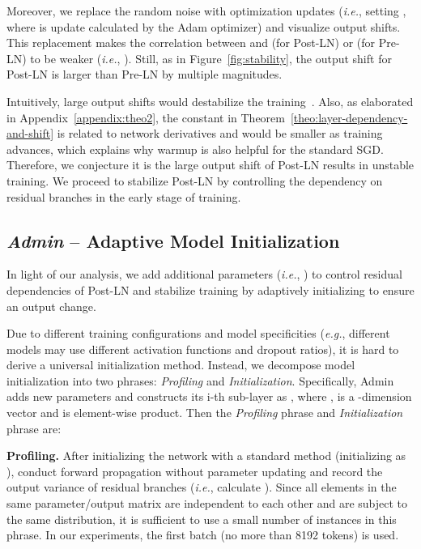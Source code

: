 \documentclass[11pt,a4paper]{article}
\newcommand{\our}{\mbox{Admin}\xspace}
\newcommand{\eg}{\textit{e.g.}}
\newcommand{\ie}{\textit{i.e.}}
\newcommand{\smallsection}[1]{{\vspace{0.2cm}\noindent\textbf{#1.}}}
\begin{document}
Moreover, we replace the random noise  with optimization updates (\ie, setting , where  is update calculated by the Adam optimizer) and visualize output shifts. 
This replacement makes the correlation between  and  (for Post-LN) or  (for Pre-LN) to be weaker (\ie, ).
Still, as in Figure~\ref{fig:stability}, the output shift  for Post-LN is larger than Pre-LN by multiple magnitudes. 

Intuitively, large output shifts would destabilize the training~\cite{Li2018VisualizingTL}.
Also, as elaborated in Appendix~\ref{appendix:theo2}, the constant  in Theorem~\ref{theo:layer-dependency-and-shift} is related to network derivatives and would be smaller as training advances, which explains why warmup is also helpful for the standard SGD. 
Therefore, we conjecture it is the large output shift of Post-LN results in unstable training.
We proceed to stabilize Post-LN by controlling the dependency on residual branches in the early stage of training. 



\subsection{\textit{Admin} -- Adaptive Model Initialization}
\label{subsec:admin}

In light of our analysis, we add additional parameters (\ie, ) to control residual dependencies of Post-LN and stabilize training by adaptively initializing  
to ensure an  output change. 

Due to different training configurations and model specificities (\eg, different models may use different activation functions and dropout ratios), it is hard to derive a universal initialization method. 
Instead, we decompose model initialization into two phrases: \textit{Profiling} and \textit{Initialization}. 
Specifically, \our adds new parameters  and constructs its i-th sub-layer as , where ,  is a -dimension vector and  is element-wise product. 
Then the \textit{Profiling} phrase and \textit{Initialization} phrase are:

\smallsection{Profiling}
After initializing the network with a standard method (initializing  as ), conduct forward propagation without parameter updating and record the output variance of residual branches (\ie, calculate ). 
Since all elements in the same parameter/output matrix are independent to each other and are subject to the same distribution, it is sufficient to use a small number of instances in this phrase.
In our experiments, the first batch (no more than 8192 tokens) is used. 
\end{document}
